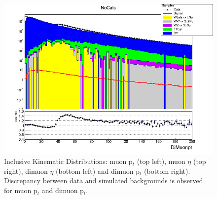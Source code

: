 \begin{figure}[htbp]
    \includegraphics[width=0.45\linewidth]{figures/ch_higgs/distributions/baseline_kalman/distribution__NoCats__DiMuonpt__logY.png}
    \caption{Inclusive Kinematic Distributions: muon p$_t$ (top left), muon $\eta$ (top right), dimuon $\eta$ (bottom left) and dimuon p$_t$ (bottom right). Discrepancy between data and simulated backgrounds is observed for muon p$_t$ and dimuon p$_t$.}
    \label{fig:higgs_selections_inclusivekinematic}
  \end{figure}

